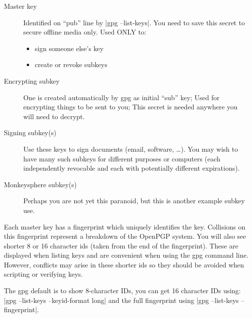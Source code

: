 \documentclass[letterpaper]{article}
\def\tightitems{\setlength{\parskip}{0pt}}
\def\TODO#1{\textsl{[[TODO: #1]]}}
\renewcommand{\_}[1]{\ifmmode_{_{#1}}\else\underline{\phantom{n}}$\,$#1\fi}
\begin{document}
\begin{description}
\item[Master key] Identified on ``pub'' line by |gpg --list-keys|. You need
  to save this secret to secure offline media only. Used ONLY to:\\[-4ex]
  \begin{itemize}\tightitems
  \item sign someone else's key
  \item create or revoke subkeys
  \end{itemize}
\item[Encrypting subkey] One is created automatically by gpg as initial
  ``sub'' key; Used for encrypting things to be sent to you; This secret is
  needed anywhere you will need to decrypt.
\item[Signing subkey(s)] Use these keys to sign documents (email, software,
  \dots). You may wish to have many such subkeys for different purposes or
  computers (each independently revocable and each with potentially
  different expirations).
\item[Monkeysphere subkey(s)] Perhaps you are not yet this paranoid, but
  this is another example subkey use.
\end{description}

Each master key has a fingerprint which uniquely identifies the key.
Collisions on this fingerprint represent a breakdown of the OpenPGP system.
You will also see shorter 8 or 16 character ids (taken from the end of the
fingerprint). These are displayed when listing keys and are convenient when
using the gpg command line. However, conflicts may arise in these shorter
ids so they should be avoided when scripting or verifying keys.

The gpg default is to show 8-character IDs, you can get 16 character IDs
using: |gpg --list-keys --keyid-format long| and the full fingerprint using
|gpg --list-keys --fingerprint|.


\end{document}
